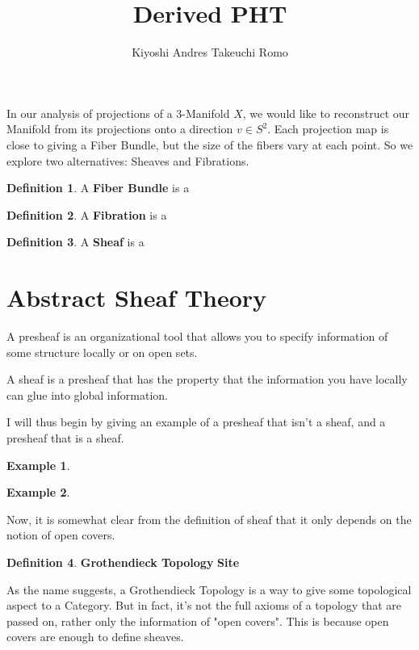 \documentclass[12pt]{article}
\title{Derived PHT}
\author{Kiyoshi Andres Takeuchi Romo}
\theoremstyle{theorem}
\theoremstyle{definition}
\newtheorem{definition}{Definition} [section]
\newtheorem{example}{Example}
\theoremstyle{remark}
\theoremstyle{gremark}
\theoremstyle{discussion}
\theoremstyle{notation}
\begin{document}
	
	\maketitle
	
	
	In our analysis of projections of a $3$-Manifold $X$, we would like to reconstruct our Manifold from its projections onto a direction $v\in S^2$. Each projection map is close to giving a Fiber Bundle, but the size of the fibers vary at each point. So we explore two alternatives: Sheaves and Fibrations.
	
	\begin{definition}
		A \textbf{Fiber Bundle} is a 
	\end{definition}

	\begin{definition}
		A \textbf{Fibration} is a 
	\end{definition}

	\begin{definition}
		A \textbf{Sheaf} is a 
	\end{definition}
	
	\section*{Abstract Sheaf Theory}
	
	A presheaf is an organizational tool that allows you to specify information of some structure locally or on open sets.
	
	A sheaf is a presheaf that has the property that the information you have locally can glue into global information.
	
	I will thus begin by giving an example of a presheaf that isn't a sheaf, and a presheaf that is a sheaf.
	
	\begin{example}
		
	\end{example}

	\begin{example}
		
	\end{example}

	Now, it is somewhat clear from the definition of sheaf that it only depends on the notion of open covers. 
	
	\begin{definition}
		\textbf{Grothendieck Topology}
		\textbf{Site}
	\end{definition}

	As the name suggests, a Grothendieck Topology is a way to give some topological aspect to a Category. But in fact, it's not the full axioms of a topology that are passed on, rather only the information of "open covers". This is because open covers are enough to define sheaves.
	
\end{document}
